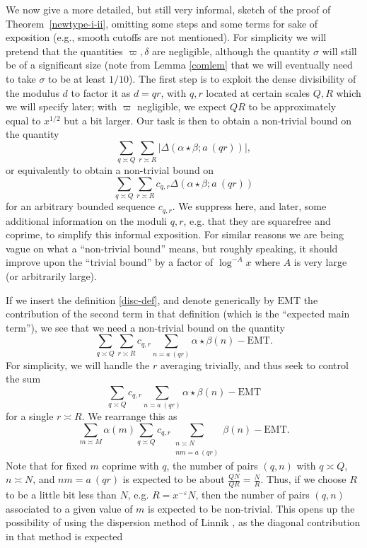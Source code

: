 \documentclass[12pt,a4paper,reqno]{amsart}
\numberwithin{equation}{section}
\theoremstyle{plain}
\theoremstyle{definition}
\newcommand\eps{\varepsilon}
\newcommand{\emt}{\mathrm{EMT}}
\renewcommand{\sim}{\asymp}
\begin{document}
We now give a more detailed, but still very informal, sketch of the
proof of Theorem~\ref{newtype-i-ii}, omitting some steps and some
terms for sake of exposition (e.g., smooth cutoffs are not
mentioned). For simplicity we will pretend that the quantities
$\varpi,\delta$ are negligible, although the quantity $\sigma$ will
still be of a significant size (note from Lemma \ref{comlem} that we
will eventually need to take $\sigma$ to be at least $1/10$).  The
first step is to exploit the dense divisibility of the modulus $d$ to
factor it as $d=qr$, with $q,r$ located at certain scales $Q, R$ which
we will specify later; with $\varpi$ negligible, we expect $QR$ to be
approximately equal to $x^{1/2}$ but a bit larger.  Our task is then
to obtain a non-trivial bound on the quantity
$$ 
\sum_{q\sim Q} \sum_{r \sim R} |\Delta(\alpha \star \beta; a\ (qr))|,
$$
or equivalently to obtain a non-trivial bound on
$$ 
\sum_{q\sim Q} \sum_{r \sim R} c_{q,r} \Delta(\alpha \star \beta; a\
(qr))
$$
for an arbitrary bounded sequence $c_{q,r}$. We suppress here, and
later, some additional information on the moduli $q,r$, e.g. that they
are squarefree and coprime, to simplify this informal exposition. 
For similar reasons we are being vague on what a ``non-trivial bound''
means, but roughly speaking, it should improve upon the ``trivial
bound'' by a factor of $\log^{-A}x$ where $A$ is very large (or
arbitrarily large).
\par
If we insert the definition \eqref{disc-def}, and denote generically
by $\emt$ the contribution of the second term in that definition
(which is the ``expected main term''), we see that we need a
non-trivial bound on the quantity
$$
\sum_{q\sim Q} \sum_{r \sim R} c_{q,r} \sum_{n= a\ (qr)} \alpha \star
\beta(n)-\emt.
$$ 
For simplicity, we will handle the $r$ averaging trivially, and thus seek to control
the sum
$$
 \sum_{q\sim Q} c_{q,r} \sum_{n= a\ (qr)} \alpha \star \beta(n)-\emt
$$
for a single $r\sim R$.  We rearrange this as
$$
\sum_{m \sim M} \alpha(m) \sum_{q\sim Q} c_{q,r} \sum_{\substack{n
    \sim N\\ nm = a\ (qr)}} \beta(n)-\emt.
$$
Note that for fixed $m$ coprime with $q$, the number of pairs $(q,n)$ with $q \sim Q$,
$n \sim N$, and $nm = a\ (qr)$ is expected to be about $\frac{QN}{QR}
= \frac{N}{R}$.  Thus, if we choose $R$ to be a little bit less than
$N$, e.g. $R = x^{-\eps} N$, then the number of pairs $(q,n)$
associated to a given value of $m$ is expected to be non-trivial. This
opens up the possibility of using the dispersion method of Linnik
\cite{linnik}, as the diagonal contribution in that method is expected
\end{document}
